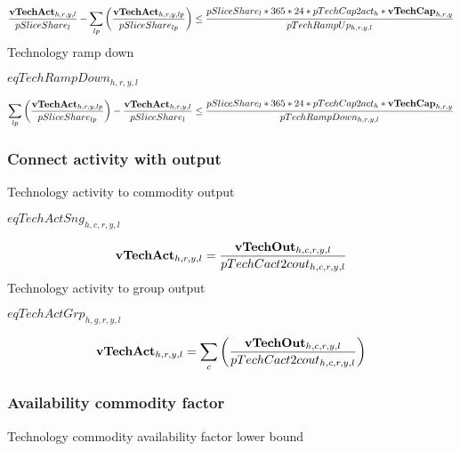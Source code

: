 \documentclass{article}
\begin{document}
\begin{dmath} 
\frac{{\bf vTechAct}_{h,r,y,l}}{pSliceShare_{l}}-\sum_{lp}{\left(\frac{{\bf vTechAct}_{h,r,y,lp}}{pSliceShare_{lp}}\right)}  \le  \frac{pSliceShare_{l}*365*24*pTechCap2act_{h}*{\bf vTechCap}_{h,r,y}}{pTechRampUp_{h,r,y,l}}
\end{dmath} 
Technology ramp down







$eqTechRampDown_{h,r,y,l}$





\begin{dmath} 
\sum_{lp}{\left(\frac{{\bf vTechAct}_{h,r,y,lp}}{pSliceShare_{lp}}\right)}-\frac{{\bf vTechAct}_{h,r,y,l}}{pSliceShare_{l}}  \le  \frac{pSliceShare_{l}*365*24*pTechCap2act_{h}*{\bf vTechCap}_{h,r,y}}{pTechRampDown_{h,r,y,l}}
\end{dmath} 
\subsubsection*{Connect activity with output}
Technology activity to commodity output







$eqTechActSng_{h,c,r,y,l}$





\begin{dmath} 
{\bf vTechAct}_{h,r,y,l}  =  \frac{{\bf vTechOut}_{h,c,r,y,l}}{pTechCact2cout_{h,c,r,y,l}}
\end{dmath} 
Technology activity to group output







$eqTechActGrp_{h,g,r,y,l}$





\begin{dmath} 
{\bf vTechAct}_{h,r,y,l}  =  \sum_{c}{\left(\frac{{\bf vTechOut}_{h,c,r,y,l}}{pTechCact2cout_{h,c,r,y,l}}\right)}
\end{dmath} 
\subsubsection*{Availability commodity factor}
Technology commodity availability factor lower bound
\end{document}
